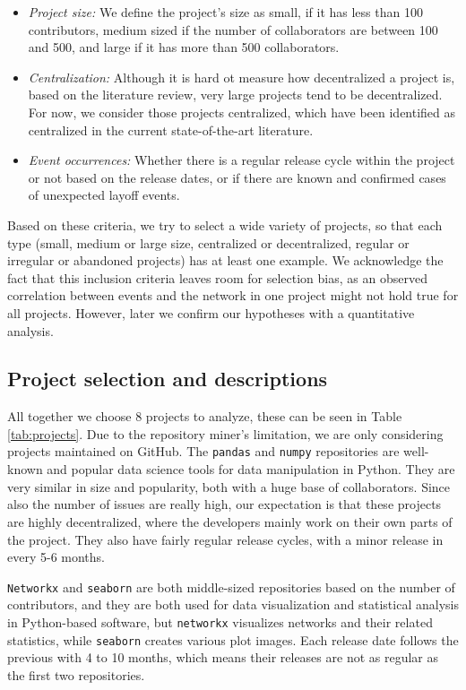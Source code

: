 \begin{itemize}
    \item \textit{Project size:} We define the project's size as small, if it has less than 100 contributors, medium sized if the number of collaborators are between 100 and 500, and large if it has more than 500 collaborators.
    \item \textit{Centralization:} Although it is hard ot measure how decentralized a project is, based on the literature review, very large projects tend to be decentralized. For now, we consider those projects centralized, which have been identified as centralized in the current state-of-the-art literature. 
    \item \textit{Event occurrences:} Whether there is a regular release cycle within the project or not based on the release dates, or if there are known and confirmed cases of unexpected layoff events.
\end{itemize}

Based on these criteria, we try to select a wide variety of projects, so that each type (small, medium or large size, centralized or decentralized, regular or irregular or abandoned projects) has at least one example. We acknowledge the fact that this inclusion criteria leaves room for selection bias, as an observed correlation between events and the network in one project might not hold true for all projects. However, later we confirm our hypotheses with a quantitative analysis.

\subsection{Project selection and descriptions}

All together we choose 8 projects to analyze, these can be seen in Table \ref{tab:projects}. Due to the repository miner's limitation, we are only considering projects maintained on GitHub. The \texttt{pandas} and \texttt{numpy} repositories are well-known and popular data science tools for data manipulation in Python. They are very similar in size and popularity, both with a huge base of collaborators. Since also the number of issues are really high, our expectation is that these projects are highly decentralized, where the developers mainly work on their own parts of the project. They also have fairly regular release cycles, with a minor release in every 5-6 months.

\texttt{Networkx} and \texttt{seaborn} are both middle-sized repositories based on the number of contributors, and they are both used for data visualization and statistical analysis in Python-based software, but \texttt{networkx} visualizes networks and their related statistics, while \texttt{seaborn} creates various plot images. Each release date follows the previous with 4 to 10 months, which means their releases are not as regular as the first two repositories.

